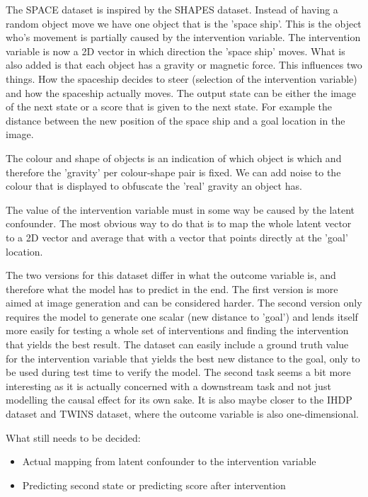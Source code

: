 \documentclass{article}
\begin{document}
\noindent
The SPACE dataset is inspired by the SHAPES dataset. Instead of having a random object move we have one object that is the 'space ship'. This is the object who's movement is partially caused by the intervention variable. The intervention variable is now a 2D vector in which direction the 'space ship' moves. What is also added is that each object has a gravity or magnetic force. This influences two things. How the spaceship decides to steer (selection of the intervention variable) and how the spaceship actually moves. The output state can be either the image of the next state or a score that is given to the next state. For example the distance between the new position of the space ship and a goal location in the image.

The colour and shape of objects is an indication of which object is which and therefore the 'gravity' per colour-shape pair is fixed. We can add noise to the colour that is displayed to obfuscate the 'real' gravity an object has.

The value of the intervention variable must in some way be caused by the latent confounder. The most obvious way to do that is to map the whole latent vector to a 2D vector and average that with a vector that points directly at the 'goal' location.

The two versions for this dataset differ in what the outcome variable is, and therefore what the model has to predict in the end. The first version is more aimed at image generation and can be considered harder. The second version only requires the model to generate one scalar (new distance to 'goal') and lends itself more easily for testing a whole set of interventions and finding the intervention that yields the best result. The dataset can easily include a ground truth value for the intervention variable that yields the best new distance to the goal, only to be used during test time to verify the model. The second task seems a bit more interesting as it is actually concerned with a downstream task and not just modelling the causal effect for its own sake. It is also maybe closer to the IHDP dataset and TWINS dataset, where the outcome variable is also one-dimensional.

What still needs to be decided:
\begin{itemize}
    \item Actual mapping from latent confounder to the intervention variable
    \item Predicting second state or predicting score after intervention
\end{itemize}
\end{document}
